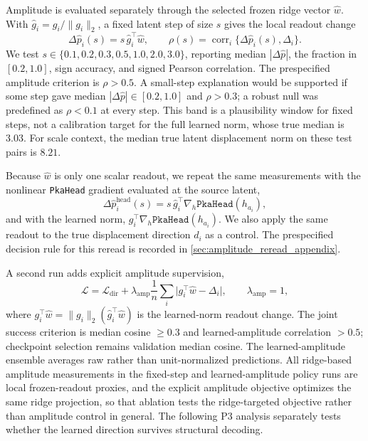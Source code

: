 \documentclass[11pt]{article}
\begin{document}
Amplitude is evaluated separately through the selected frozen ridge vector $\hat w$. With $\hat g_i=g_i/\lVert g_i\rVert_2$, a fixed latent step of size $s$ gives the local readout change
\begin{equation}
 \Delta\hat p_i(s)=s\,\hat g_i^\top\hat w,
 \qquad
 \rho(s)=\operatorname{corr}_i\{\Delta\hat p_i(s),\Delta_i\}.
\end{equation}
We test $s\in\{0.1,0.2,0.3,0.5,1.0,2.0,3.0\}$, reporting median $|\Delta\hat p|$, the fraction in $[0.2,1.0]$, sign accuracy, and signed Pearson correlation. The prespecified amplitude criterion is $\rho>0.5$. A small-step explanation would be supported if some step gave median $|\Delta\hat p|\in[0.2,1.0]$ and $\rho>0.3$; a robust null was predefined as $\rho<0.1$ at every step. This band is a plausibility window for fixed steps, not a calibration target for the full learned norm, whose true median is $3.03$. For scale context, the median true latent displacement norm on these test pairs is $8.21$.

Because $\hat w$ is only one scalar readout, we repeat the same measurements with the nonlinear \texttt{PkaHead} gradient evaluated at the source latent,
\begin{equation}
 \Delta\hat p_i^{\mathrm{head}}(s)=s\,\hat g_i^\top\nabla_h\texttt{PkaHead}(h_{a_i}),
\end{equation}
and with the learned norm, $g_i^\top\nabla_h\texttt{PkaHead}(h_{a_i})$. We also apply the same readout to the true displacement direction $d_i$ as a control. The prespecified decision rule for this reread is recorded in \cref{sec:amplitude_reread_appendix}.

A second run adds explicit amplitude supervision,
\begin{equation}
 \mathcal L=\mathcal L_{\mathrm{dir}}+
 \lambda_{\mathrm{amp}}\frac1n\sum_i\lvert g_i^\top\hat w-\Delta_i\rvert,
 \qquad \lambda_{\mathrm{amp}}=1,
\end{equation}
where $g_i^\top\hat w=\lVert g_i\rVert_2(\hat g_i^\top\hat w)$ is the learned-norm readout change. The joint success criterion is median cosine $\geq0.3$ and learned-amplitude correlation $>0.5$; checkpoint selection remains validation median cosine. The learned-amplitude ensemble averages raw rather than unit-normalized predictions. All ridge-based amplitude measurements in the fixed-step and learned-amplitude policy runs are local frozen-readout proxies, and the explicit amplitude objective optimizes the same ridge projection, so that ablation tests the ridge-targeted objective rather than amplitude control in general. The following P3 analysis separately tests whether the learned direction survives structural decoding.
\end{document}
